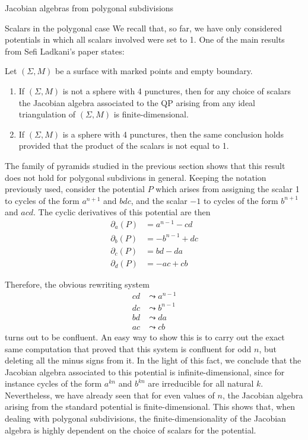 \begin{chapter}{Jacobian algebras from polygonal subdivisions}
\begin{section}{Scalars in the polygonal case}
We recall that, so far, we have only considered potentials in which all scalars involved were set to 1. One of the main results from Sefi Ladkani's paper \cite{Lad12} states:
\begin{thm} Let $(\Sigma, M)$ be a surface with marked points and empty boundary.
\begin{enumerate}
\item If $(\Sigma, M)$ is not a sphere with 4 punctures, then for any choice of scalars the Jacobian algebra associated to the QP arising from any ideal triangulation of $(\Sigma, M)$ is finite-dimensional.
\item If $(\Sigma, M)$ is a sphere with 4 punctures, then the same conclusion holds provided that the product of the scalars is not equal to 1.
\end{enumerate}
\end{thm}

The family of pyramids studied in the previous section shows that this result does not hold for polygonal subdivions in general. Keeping the notation previously used, consider the potential $P$ which arises from assigning the scalar 1 to cycles of the form $a^{n+1}$ and $bdc$, and the scalar $-1$ to cycles of the form $b^{n+1}$ and $acd$. The cyclic derivatives of this potential are then
\begin{align*}
\partial_a(P) &= a^{n-1} - cd\\
\partial_b(P) &= -b^{n-1} + dc\\
\partial_c(P) &= bd - da\\
\partial_d(P) &= -ac + cb
\end{align*}

Therefore, the obvious rewriting system
\begin{align*}
cd &\leadsto a^{n-1}\tag{$\partial_a$}\\
dc &\leadsto b^{n-1}\tag{$\partial_b$}\\
bd &\leadsto da\tag{$\partial_c$}\\
ac &\leadsto cb\tag{$\partial_d$}
\end{align*}
turns out to be confluent. An easy way to show this is to carry out the exact same computation that proved that this system is confluent for odd $n$, but deleting all the minus signs from it. In the light of this fact, we conclude that the Jacobian algebra associated to this potential is infinite-dimensional, since for instance cycles of the form $a^{kn}$ and $b^{kn}$ are irreducible for all natural $k$. Nevertheless, we have already seen that for even values of $n$, the Jacobian algebra arising from the standard potential is finite-dimensional. This shows that, when dealing with polygonal subdivisions, the finite-dimensionality of the Jacobian algebra is highly dependent on the choice of scalars for the potential.
\end{section}


\end{chapter}
